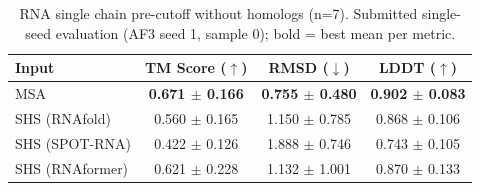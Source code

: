\begin{table}[htbp]
\centering
\caption{RNA single chain pre-cutoff without homologs (n=7). Submitted single-seed evaluation (AF3 seed 1, sample 0); bold = best mean per metric.}
\label{tab:rna_single_chain_pre_cutoff_without_homologs}
\begin{tabular}{lccc}
\toprule
Input & TM Score ($\uparrow$) & RMSD ($\downarrow$) & LDDT ($\uparrow$) \\
\midrule
MSA & \textbf{0.671 $\pm$ 0.166} & \textbf{0.755 $\pm$ 0.480} & \textbf{0.902 $\pm$ 0.083} \\
SHS (RNAfold) & 0.560 $\pm$ 0.165 & 1.150 $\pm$ 0.785 & 0.868 $\pm$ 0.106 \\
SHS (SPOT-RNA) & 0.422 $\pm$ 0.126 & 1.888 $\pm$ 0.746 & 0.743 $\pm$ 0.105 \\
SHS (RNAformer) & 0.621 $\pm$ 0.228 & 1.132 $\pm$ 1.001 & 0.870 $\pm$ 0.133 \\
\bottomrule
\end{tabular}
\end{table}

